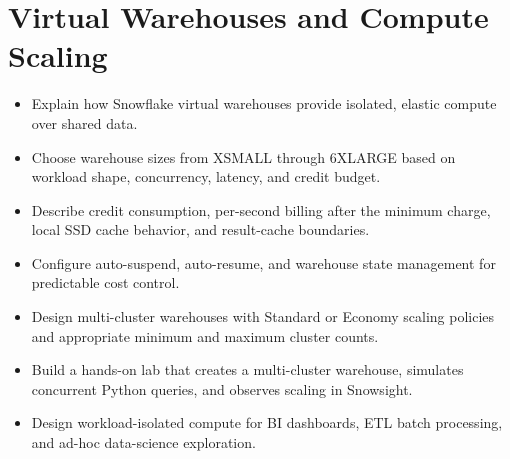 \chapter{Virtual Warehouses and Compute Scaling}
%
\begin{objectives}
\begin{itemize}
    \item Explain how Snowflake virtual warehouses provide isolated, elastic compute over shared data.
    \item Choose warehouse sizes from XSMALL through 6XLARGE based on workload shape, concurrency, latency, and credit budget.
    \item Describe credit consumption, per-second billing after the minimum charge, local SSD cache behavior, and result-cache boundaries.
    \item Configure auto-suspend, auto-resume, and warehouse state management for predictable cost control.
    \item Design multi-cluster warehouses with Standard or Economy scaling policies and appropriate minimum and maximum cluster counts.
    \item Build a hands-on lab that creates a multi-cluster warehouse, simulates concurrent Python queries, and observes scaling in Snowsight.
    \item Design workload-isolated compute for BI dashboards, ETL batch processing, and ad-hoc data-science exploration.
\end{itemize}
\end{objectives}

